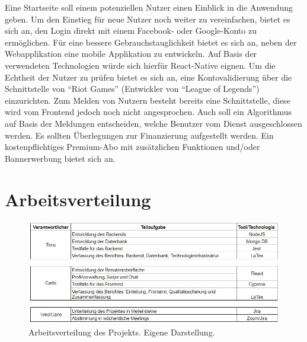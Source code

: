 Eine Startseite soll einem potenziellen Nutzer einen Einblick in die Anwendung geben.
Um den Einstieg für neue Nutzer noch weiter zu vereinfachen, bietet es sich an, den Login direkt mit einem Facebook- oder Google-Konto zu ermöglichen.
Für eine bessere Gebrauchstauglichkeit %
bietet es sich an, neben der Webapplikation eine mobile Applikation zu entwickeln.
Auf Basis der verwendeten Technologien würde sich hierfür React-Native eignen.
Um die Echtheit der Nutzer zu prüfen bietet es sich an, eine Kontovalidierung über die Schnittstelle von \enquote{Riot Games} (Entwickler von \enquote{League of Legends}) einzurichten.
Zum Melden von Nutzern besteht bereits eine Schnittstelle, diese wird vom Frontend jedoch noch nicht angesprochen.
Auch soll ein Algorithmus auf Basis der Meldungen entscheiden, welche Benutzer vom Dienst ausgeschlossen werden.
Es sollten Überlegungen zur Finanzierung aufgestellt werden.
Ein kostenpflichtiges Premium-Abo mit zusätzlichen Funktionen und/oder Bannerwerbung bietet sich an.

\section*{Arbeitsverteilung}

\begin{figure}[h!]
    \centering
    \includegraphics[scale=0.7]{sources/Arbeitsverteilung}
    \caption{Arbeitsverteilung des Projekts. Eigene Darstellung.}
    \label{fig:Antwort_Serverabfrage} 
  \end{figure}